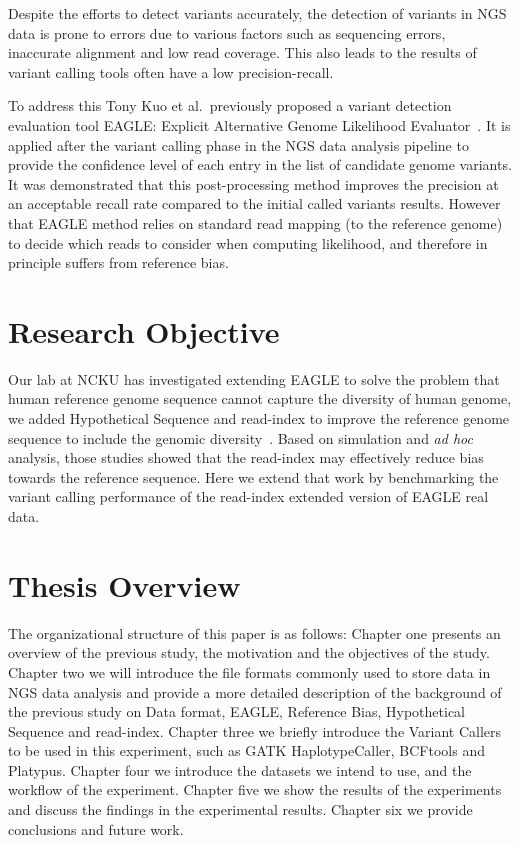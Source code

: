 \documentclass[PhD]{PHlab-thesis}
\begin{document}
Despite the efforts to detect variants accurately, the detection of variants in NGS data is prone to errors due to various factors such as sequencing errors, inaccurate alignment and low read coverage. This also leads to the results of variant calling tools often have a low precision-recall. 

To address this Tony Kuo et al.\ previously proposed a variant detection evaluation tool EAGLE: Explicit Alternative Genome Likelihood Evaluator~\cite{Kuo2018EAGLE}.  It is applied after the variant calling phase in the NGS data analysis pipeline to provide the confidence level of each entry in the list of candidate genome variants. It was demonstrated that this post-processing method improves the precision at an acceptable recall rate compared to the initial called variants results.  However that EAGLE method relies on standard read mapping (to the reference genome) to decide which reads to consider when computing likelihood, and therefore in principle suffers from reference bias.

\section{Research Objective}
Our lab at NCKU has investigated extending EAGLE to solve the problem that human reference genome sequence cannot capture the diversity of human genome, we added Hypothetical Sequence and read-index to improve the reference genome sequence to include the genomic diversity~\cite{Chou2020HS, Su2021RI}.  Based on simulation and \textit{ad hoc} analysis, those studies showed that the read-index may effectively reduce bias towards the reference sequence.  Here we extend that work by benchmarking the variant calling performance of the read-index extended version of EAGLE real data.

\section{Thesis Overview}
The organizational structure of this paper is as follows: Chapter one presents an overview of the previous study, the motivation and the objectives of the study. Chapter two we will introduce the file formats commonly used to store data in NGS data analysis and provide a more detailed description of the background of the previous study on Data format, EAGLE, Reference Bias, Hypothetical Sequence and read-index. Chapter three we briefly introduce the Variant Callers to be used in this experiment, such as GATK HaplotypeCaller, BCFtools and Platypus. Chapter four we introduce the datasets we intend to use, and the workflow of the experiment. Chapter five we show the results of the experiments and discuss the findings in the experimental results. Chapter six we provide conclusions and future work.
\end{document}
